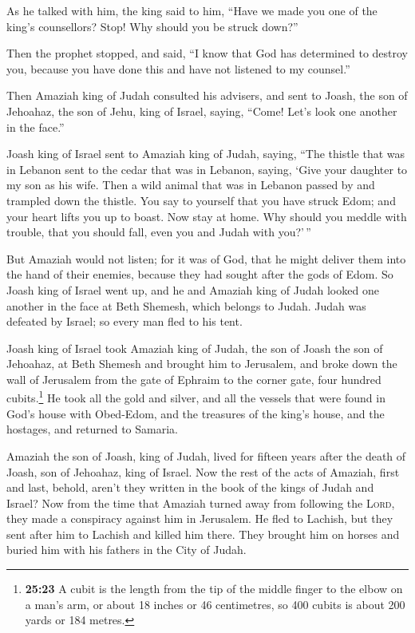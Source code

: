  As he talked with him, the king said to him, ``Have we
made you one of the king's counsellors? Stop! Why should you be struck
down?''

Then the prophet stopped, and said, ``I know that God has determined to
destroy you, because you have done this and have not listened to my
counsel.''

 Then Amaziah king of Judah consulted his advisers, and
sent to Joash, the son of Jehoahaz, the son of Jehu, king of Israel,
saying, ``Come! Let's look one another in the face.''

 Joash king of Israel sent to Amaziah king of Judah,
saying, ``The thistle that was in Lebanon sent to the cedar that was in
Lebanon, saying, `Give your daughter to my son as his wife. Then a wild
animal that was in Lebanon passed by and trampled down the thistle.
 You say to yourself that you have struck Edom; and your
heart lifts you up to boast. Now stay at home. Why should you meddle
with trouble, that you should fall, even you and Judah with you?'\,''

 But Amaziah would not listen; for it was of God, that he
might deliver them into the hand of their enemies, because they had
sought after the gods of Edom.  So Joash king of Israel
went up, and he and Amaziah king of Judah looked one another in the face
at Beth Shemesh, which belongs to Judah.  Judah was
defeated by Israel; so every man fled to his tent.

 Joash king of Israel took Amaziah king of Judah, the son
of Joash the son of Jehoahaz, at Beth Shemesh and brought him to
Jerusalem, and broke down the wall of Jerusalem from the gate of Ephraim
to the corner gate, four hundred cubits.\footnote{\textbf{25:23} A cubit
  is the length from the tip of the middle finger to the elbow on a
  man's arm, or about 18 inches or 46 centimetres, so 400 cubits is
  about 200 yards or 184 metres.}  He took all the gold
and silver, and all the vessels that were found in God's house with
Obed-Edom, and the treasures of the king's house, and the hostages, and
returned to Samaria.

 Amaziah the son of Joash, king of Judah, lived for
fifteen years after the death of Joash, son of Jehoahaz, king of Israel.
 Now the rest of the acts of Amaziah, first and last,
behold, aren't they written in the book of the kings of Judah and
Israel?  Now from the time that Amaziah turned away from
following the \textsc{Lord}, they made a conspiracy against him in
Jerusalem. He fled to Lachish, but they sent after him to Lachish and
killed him there.  They brought him on horses and buried
him with his fathers in the City of Judah.

